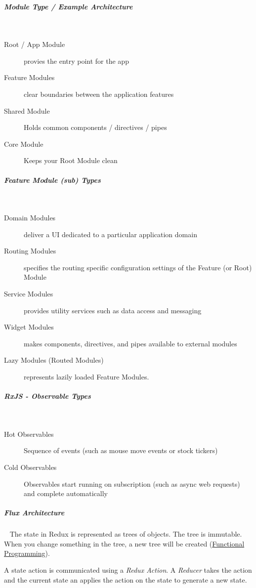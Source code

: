 \documentclass[11pt,twoside,landscape]{article}
\begin{document}
\begin{multicols}{3}
\begin{description}
\end{description}
\subparagraph{Module Type / Example Architecture} \
\label{sec:org807bb38}
\begin{description}
\item[{Root / App Module}] provies the entry point for the app
\item[{Feature Modules}] clear boundaries between the application features
\item[{Shared Module}] Holds common components / directives / pipes
\item[{Core Module}] Keeps your Root Module clean
\end{description}
\subparagraph{Feature Module (sub) Types} \
\label{sec:orgd654b4f}
\begin{description}
\item[{Domain Modules}] deliver a UI dedicated to a particular application domain
\item[{Routing Modules}] specifies the routing specific configuration settings of the Feature (or Root) Module
\item[{Service Modules}] provides utility services such as data access and messaging
\item[{Widget Modules}] makes components, directives, and pipes available to external modules
\item[{Lazy Modules (Routed Modules)}] represents lazily loaded Feature Modules.
\end{description}
\subparagraph{RxJS - Observable Types} \
\label{sec:orgad1f940}
\begin{description}
\item[{Hot Observables}] Sequence of events (such as mouse move events or stock tickers)
\item[{Cold Observables}] Observables start running on subscription (such as async web requests) and complete automatically
\end{description}
\subparagraph{Flux Architecture} \
\label{sec:org59931ef}
The state in Redux is represented as trees of objects.
The tree is immutable.
When you change something in the tree, a new tree will be created (\href{../../../roam/20220616080932-functional_programming.org}{Functional Programming}).

A state action is communicated using a \emph{Redux Action}.
A \emph{Reducer} takes the action and the current state an applies the action on the state to generate a new state.


\end{multicols}
\end{document}
